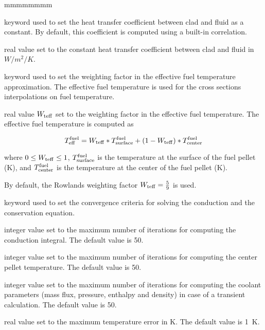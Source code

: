 \begin{ListeDeDescription}{mmmmmmmm}
\item[\moc{HCONV}] keyword used to set the heat transfer coefficient between clad and fluid as a constant.
By default, this coefficient is computed using a built-in correlation.

\item[\dusa{hconv}] real value set to the constant heat transfer coefficient between clad and fluid in $W/m^2/K$.

\item[\moc{TEFF}] keyword used to set the weighting factor in the effective fuel temperature approximation.
The effective fuel temperature is used for the cross sections interpolations on fuel temperature.

\item[\dusa{wteff}] real value $W_{\rm teff}$ set to the weighting factor in the effective fuel temperature.
The effective fuel temperature is computed as

$$
T^{\rm fuel}_{\rm eff}=W_{\rm teff}*T^{\rm fuel}_{\rm surface}+(1-W_{\rm teff})*T^{\rm fuel}_{\rm center}
$$

where $0\le W_{\rm teff} \le 1$, $T^{\rm fuel}_{\rm surface}$ is the temperature at the surface of the fuel pellet (K), and $T^{\rm fuel}_{\rm center}$ is the temperature at the center of the fuel pellet (K).

By default, the Rowlands weighting factor $W_{\rm teff}={5 \over 9}$ is used\cite{Rowlands}.

\item[\moc{CONV}] keyword used to set the convergence criteria for solving the conduction and the conservation equation.

\item[\dusa{maxit1}] integer value set to the maximum number of iterations for computing the
conduction integral. The default value is 50.

\item[\dusa{maxit2}] integer value set to the maximum number of iterations for computing the
center pellet temperature. The default value is 50.

\item[\dusa{maxit3}] integer value set to the maximum number of iterations for computing the
coolant parameters (mass flux, pressure, enthalpy and density) in case of a transient calculation. The default value is 50.

\item[\dusa{ermaxt}] real value set to the maximum temperature error in K. The default value is 1~K.


\end{ListeDeDescription}
